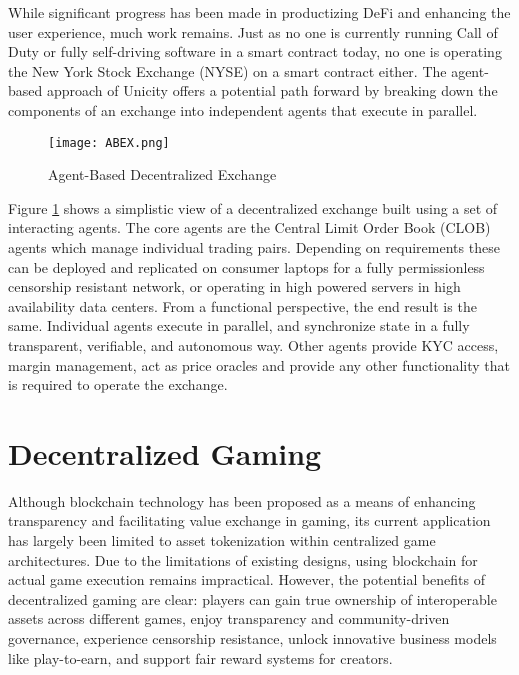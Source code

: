 \documentclass{article}
\begin{document}
\vspace{2mm}

While significant progress has been made in productizing DeFi and enhancing the user experience, much work remains. Just as no one is currently running Call of Duty or fully self-driving software in a smart contract today, no one is operating the New York Stock Exchange (NYSE) on a smart contract either. The agent-based approach of Unicity offers a potential path forward by breaking down the components of an exchange into independent agents that execute in parallel. 

\begin{figure}[H]
    \centering
    \texttt{[image: ABEX.png]}
    \caption{Agent-Based Decentralized Exchange}
    \label{fig:ABEX}
\end{figure}

 
Figure \ref{fig:ABEX} shows a simplistic view of a decentralized exchange built using a set of interacting agents. The core agents are the Central Limit Order Book (CLOB) agents which manage individual trading pairs. Depending on requirements these can be deployed and replicated on consumer laptops for a fully permissionless censorship resistant network, or operating in high powered servers in high availability data centers. From a functional perspective, the end result is the same. Individual agents execute in parallel, and synchronize state in a fully transparent, verifiable, and autonomous way. Other agents provide KYC access, margin management, act as price oracles and provide any other functionality that is required to operate the exchange. 


\section{Decentralized Gaming}

Although blockchain technology has been proposed as a means of enhancing transparency and facilitating value exchange in gaming, its current application has largely been limited to asset tokenization within centralized game architectures. Due to the limitations of existing designs, using blockchain for actual game execution remains impractical. However, the potential benefits of decentralized gaming are clear: players can gain true ownership of interoperable assets across different games, enjoy transparency and community-driven governance, experience censorship resistance, unlock innovative business models like play-to-earn, and support fair reward systems for creators.
\end{document}
